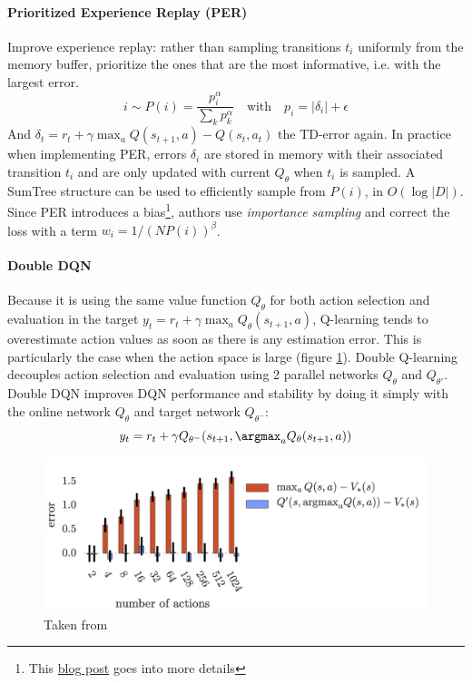 \paragraph{Prioritized Experience Replay (PER) \cite{schaul2015prioritized}}
Improve experience replay: rather than sampling transitions $t_i$ uniformly from the memory buffer, prioritize the ones that are the most informative, i.e. with the largest error.
\[
i \sim P(i) = \frac{p_i^\alpha}{\sum_k p_k^\alpha}
\quad \text{with} \quad
p_i = |\delta_i| + \epsilon
\]
And $\delta_t = r_t + \gamma \max_a Q(s_{t+1},a) - Q(s_t, a_t)$ the TD-error again. In practice when implementing PER, errors $\delta_i$ are stored in memory with their associated transition $t_i$ and are only updated with current $Q_\theta$ when $t_i$ is sampled. A SumTree structure can be used to efficiently sample from $P(i)$, in $O(\log |D|)$. Since PER introduces a bias\footnote{This \href{https://danieltakeshi.github.io/2019/07/14/per/}{blog post} goes into more details}, authors use \emph{importance sampling} and correct the loss with a term $w_i = 1 / (N P(i))^\beta$.

\paragraph{Double DQN \cite{van2016deep}}
Because it is using the same value function $Q_\theta$ for both action selection and evaluation in the target $y_t = r_t + \gamma \max_a Q_\theta(s_{t+1}, a)$, Q-learning tends to overestimate action values as soon as there is any estimation error. This is particularly the case when the action space is large (figure \ref{fig:double-dqn}). Double Q-learning \cite{hasselt2010double} decouples action selection and evaluation using 2 parallel networks $Q_\theta$ and $Q_{\theta'}$. Double DQN \cite{van2016deep} improves DQN performance and stability by doing it simply with the online network $Q_\theta$ and target network $Q_{\theta^-}$:
\[
    y_t = r_t + \gamma Q_{\theta^-}(s_{t+1}, \argmax_a Q_\theta(s_{t+1}, a))
\]

\begin{figure}[H]
    \centering
    \includegraphics[width=0.5\linewidth]{figures/double-dqn.png}
    \caption{Taken from \cite{van2016deep}}
    \label{fig:double-dqn}
\end{figure}

